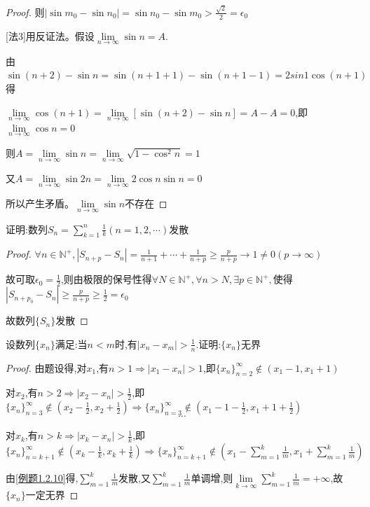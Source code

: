\begin{proof}
    则$|\sin m_0-\sin n_0|=\sin n_0-\sin m_0>\frac{\sqrt{2}}{2}=\epsilon_0$

    [法3]用反证法。假设$\lim \limits_{n \to \infty} \sin n=A$.

    由$\sin(n+2)-\sin n=\sin(n+1+1)-\sin (n+1-1)=2sin 1 \cos (n+1)$得

    $\lim \limits_{n \to \infty} \cos (n+1)=\lim \limits_{n \to \infty} [\sin(n+2)-\sin n]=A-A=0$,即$\lim \limits_{n \to \infty} \cos n = 0$

    则$A=\lim \limits_{n \to \infty} \sin n = \lim \limits_{n \to \infty} \sqrt{1-\cos^2 n} = 1$

    又$A=\lim \limits_{n \to \infty} \sin 2n=\lim \limits_{n \to \infty} 2\cos n \sin n = 0$

    所以产生矛盾。$\lim \limits_{n \to \infty} \sin n$不存在
\end{proof}



\begin{example}\label{例题1.2.10}
    证明:数列$S_n=\sum\limits_{k=1}^{n} \frac{1}{k}(n=1,2,\cdots)$发散
\end{example}

\begin{proof}

    $\forall n\in \mathbb{N}^+,|S_{n+p}-S_n|=\frac{1}{n+1}+\cdots+\frac{1}{n+p}\ge \frac{p}{n+p} \to 1 \ne 0(p \to \infty)$

    故可取$\epsilon_0=\frac{1}{2}$,则由极限的保号性得$\forall N\in \mathbb{N}^+,\forall n>N,\exists p\in \mathbb{N}^+,$使得$|S_{n+p_0}-S_{n}|\ge \frac{p}{n+p}\ge \frac{1}{2}=\epsilon_0$

    故数列$\{S_n\}$发散
\end{proof}

\begin{practice}
    设数列$\{x_n\}$满足:当$n<m$时,有$|x_n-x_m|>\frac{1}{n}$.证明:$\{x_n\}$无界
\end{practice}

\begin{proof}

    由题设得,对$x_1$,有$n>1 \Longrightarrow |x_1-x_n|>1$,即$\{x_n\}_{n=2}^\infty \notin (x_1-1,x_1+1)$

    对$x_2$,有$n>2 \Longrightarrow |x_2-x_n|>\frac{1}{2}$,即$\{x_n\}_{n=3}^\infty \notin (x_2-\frac{1}{2},x_2+\frac{1}{2}) \Longrightarrow \{x_n\}_{n=3}^\infty \notin (x_1-1-\frac{1}{2},x_1+1+\frac{1}{2})$
    $$\cdots$$

    对$x_k$,有$n>k \Longrightarrow |x_k-x_n|>\frac{1}{k}$,即$\{x_n\}_{n=k+1}^\infty \notin (x_k-\frac{1}{k},x_k+\frac{1}{k}) \Longrightarrow \{x_n\}_{n=k+1}^\infty \notin (x_1-\sum\limits_{m=1}^{k} \frac{1}{m} ,x_1+\sum\limits_{m=1}^{k} \frac{1}{m})$

    由\cref{例题1.2.10}得,$\sum\limits_{m=1}^{k} \frac{1}{m}$发散,又$\sum\limits_{m=1}^{k} \frac{1}{m}$单调增,则$\lim \limits_{k \to \infty} \sum\limits_{m=1}^{k} \frac{1}{m}=+\infty$,故$\{x_n\}$一定无界
\end{proof}


